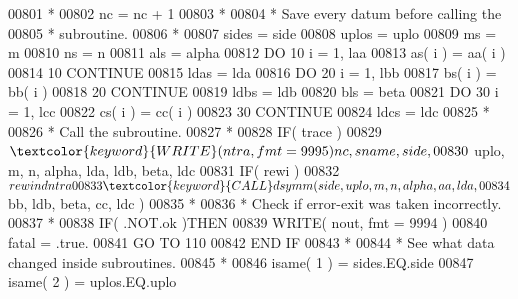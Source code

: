 \begin{DoxyCode}
00801 \textcolor{comment}{*}
00802                         nc = nc + 1
00803 \textcolor{comment}{*}
00804 \textcolor{comment}{*                       Save every datum before calling the}
00805 \textcolor{comment}{*                       subroutine.}
00806 \textcolor{comment}{*}
00807                         sides = side
00808                         uplos = uplo
00809                         ms = m
00810                         ns = n
00811                         als = alpha
00812                         \textcolor{keywordflow}{DO} 10 i = 1, laa
00813                            as( i ) = aa( i )
00814    10                   \textcolor{keywordflow}{CONTINUE}
00815                         ldas = lda
00816                         \textcolor{keywordflow}{DO} 20 i = 1, lbb
00817                            bs( i ) = bb( i )
00818    20                   \textcolor{keywordflow}{CONTINUE}
00819                         ldbs = ldb
00820                         bls = beta
00821                         \textcolor{keywordflow}{DO} 30 i = 1, lcc
00822                            cs( i ) = cc( i )
00823    30                   \textcolor{keywordflow}{CONTINUE}
00824                         ldcs = ldc
00825 \textcolor{comment}{*}
00826 \textcolor{comment}{*                       Call the subroutine.}
00827 \textcolor{comment}{*}
00828                         \textcolor{keywordflow}{IF}( trace )
00829      $                     \textcolor{keyword}{WRITE}( ntra, fmt = 9995 )nc, sname, side,
00830      $                     uplo, m, n, alpha, lda, ldb, beta, ldc
00831                         \textcolor{keywordflow}{IF}( rewi )
00832      $                     rewind ntra
00833                         \textcolor{keyword}{CALL }dsymm( side, uplo, m, n, alpha, aa, lda,
00834      $                              bb, ldb, beta, cc, ldc )
00835 \textcolor{comment}{*}
00836 \textcolor{comment}{*                       Check if error-exit was taken incorrectly.}
00837 \textcolor{comment}{*}
00838                         \textcolor{keywordflow}{IF}( .NOT.ok )\textcolor{keywordflow}{THEN}
00839                            \textcolor{keyword}{WRITE}( nout, fmt = 9994 )
00840                            fatal = .true.
00841                            \textcolor{keywordflow}{GO TO} 110
00842 \textcolor{keywordflow}{                        END IF}
00843 \textcolor{comment}{*}
00844 \textcolor{comment}{*                       See what data changed inside subroutines.}
00845 \textcolor{comment}{*}
00846                         isame( 1 ) = sides.EQ.side
00847                         isame( 2 ) = uplos.EQ.uplo

\end{DoxyCode}
